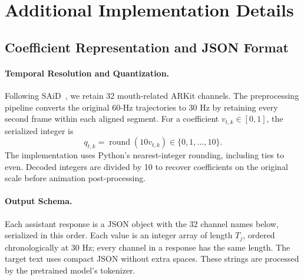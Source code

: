 \section{Additional Implementation Details}
\label{app:implementation}

\subsection{Coefficient Representation and JSON Format}
\label{app:json}

\paragraph{Temporal Resolution and Quantization.}
Following SAiD~\cite{park2023said}, we retain 32 mouth-related ARKit channels.
The preprocessing pipeline converts the original 60-Hz trajectories to 30 Hz by retaining every second frame within each aligned segment.
For a coefficient $v_{t,k}\in[0,1]$, the serialized integer is
\begin{equation}
q_{t,k}=\operatorname{round}(10v_{t,k})\in\{0,1,\ldots,10\}.
\end{equation}
The implementation uses Python's nearest-integer rounding, including ties to even.
Decoded integers are divided by 10 to recover coefficients on the original scale before animation post-processing.

\paragraph{Output Schema.}
Each assistant response is a JSON object with the 32 channel names below, serialized in this order. Each value is an integer array of length $T_j$, ordered chronologically at 30 Hz; every channel in a response has the same length.
The target text uses compact JSON without extra spaces. These strings are processed by the pretrained model's tokenizer.

